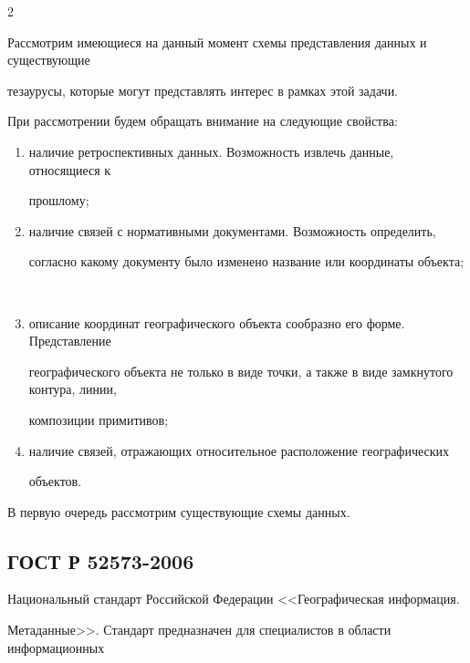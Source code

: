 \begin{multicols}{2}
  

  Рассмотрим имеющиеся на данный момент схемы представления данных и существующие 

тезаурусы, которые могут представлять интерес в рамках этой задачи.

  

  При рассмотрении будем обращать внимание на следующие свойства:

  \begin{enumerate}[(1)]

\item наличие ретроспективных данных. Возможность извлечь данные, относящиеся к 

прошлому;\\[-14pt]

\item наличие связей с нормативными документами. Возможность определить, 

согласно какому документу было изменено название или координаты объекта;

\\[-14pt]

\item описание координат географического объекта сообразно его форме. Представление 

географического объекта не только в виде точки, а также в виде замкнутого контура, линии, 

композиции примитивов;\\[-14pt]

\item наличие связей, отражающих относительное расположение географических 

объектов.

\end{enumerate}



   В первую очередь рассмотрим существующие схемы данных.

   

   \vspace*{-6pt}



  \subsection{ГОСТ Р 52573-2006}

  

  Национальный стандарт Российской Федерации <<Географическая информация. 

Метаданные>>. Стандарт предназначен для специалистов в области информационных 


\end{multicols}
